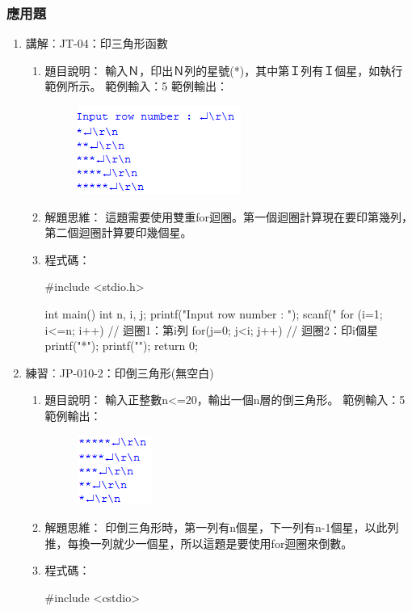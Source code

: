 \subsubsection {應用題}
\begin{enumerate}
	\item 講解︰JT-04：印三角形函數
		\begin{enumerate}
			\item 題目說明：
			\subitem 輸入Ｎ，印出Ｎ列的星號(*)，其中第Ｉ列有Ｉ個星，如執行範例所示。
			\subitem 範例輸入：5
			\subitem 範例輸出：
				\begin{figure}[H]
					\centering
					\includegraphics{fig/JT04fig}
				\end{figure}
			
			\item 解題思維：
			\subitem 
				這題需要使用雙重for迴圈。第一個迴圈計算現在要印第幾列，第二個迴圈計算要印幾個星。
			\item 程式碼：
			\begin{cppcode}
				#include <stdio.h>
				
				int main()
				{
					int n, i, j;
					printf("Input row number : \n");
					scanf("%
					for (i=1; i<=n; i++) { // 迴圈1：第i列
						for(j=0; j<i; j++) { // 迴圈2：印i個星
							printf("*");
						}
						printf("\n");
					}
					return 0;
				}
					
			\end{cppcode}
		\end{enumerate}

	\item 練習︰JP-010-2：印倒三角形(無空白)
		\begin{enumerate}
			\item 題目說明：
			\subitem 輸入正整數n<=20，輸出一個n層的倒三角形。
			\subitem 範例輸入：5
			\subitem 範例輸出：
			\begin{figure}[H]
				\centering
				\includegraphics{fig/JP010fig}
			\end{figure}
			\item 解題思維：
			\subitem 印倒三角形時，第一列有n個星，下一列有n-1個星，以此列推，每換一列就少一個星，所以這題是要使用for迴圈來倒數。
			\item 程式碼：
			\begin{cppcode}
			#include <cstdio>
			

\end{cppcode}
\end{enumerate}
\end{enumerate}
